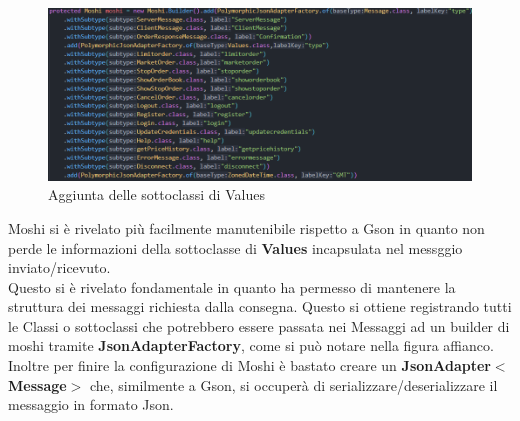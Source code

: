 \documentclass{article}
\begin{document}
\begin{figure} %
  \centering
  \includegraphics[width=\linewidth]{Moshi-Classi.png} %
  \caption{\footnotesize Aggiunta delle sottoclassi di Values}
\end{figure}

Moshi si è rivelato più facilmente manutenibile rispetto a Gson in quanto non perde le informazioni della sottoclasse di \textbf{Values} incapsulata nel messggio inviato/ricevuto.
\\Questo si è rivelato fondamentale in quanto ha permesso di mantenere la struttura dei messaggi richiesta dalla consegna. Questo si ottiene registrando tutti le Classi o sottoclassi che potrebbero essere passata nei Messaggi ad un builder di moshi tramite \textbf{JsonAdapterFactory}, come si può notare nella figura affianco.
Inoltre per finire la configurazione di Moshi è bastato creare un \textbf{JsonAdapter$<$Message$>$} che, similmente a Gson, si occuperà di serializzare/deserializzare il messaggio in formato Json.
\end{document}
